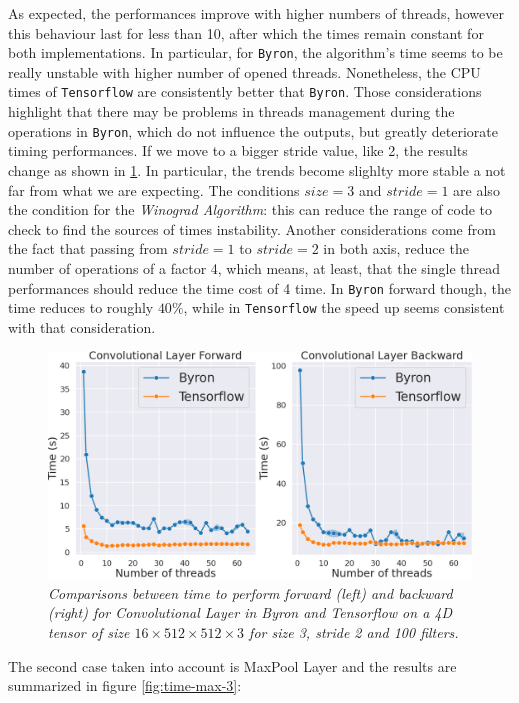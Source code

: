 \documentclass[12pt,a4paper]{report}
\begin{document}
As expected, the performances improve with higher numbers of threads, however this behaviour last for less than 10, after which the times remain constant for both implementations.
In particular, for {\tt Byron}, the algorithm's time seems to be really unstable with higher number of opened threads. 
Nonetheless, the CPU times of {\tt Tensorflow} are consistently better that {\tt Byron}.
Those considerations highlight that there may be problems in threads management during the operations in {\tt Byron}, which do not influence the outputs, but greatly deteriorate timing performances.
If we move to a bigger stride value, like 2, the results change as shown in \ref{fig:time-conv-3-2}. 
In particular, the trends become slighlty more stable a not far from what we are expecting.
The conditions $size=3$ and $stride=1$ are also the condition for the {\it Winograd Algorithm}: this can reduce the range of code to check to find the sources of times instability.
Another considerations come from the fact that passing from $stride=1$ to $stride=2$ in both axis, reduce the number of operations of a factor 4, which means, at least, that the single thread performances should reduce the time cost of 4 time.
In {\tt Byron} forward though, the time reduces to roughly $40\%$, while in {\tt Tensorflow} the speed up seems consistent with that consideration.

\begin{figure}[H]
\centering
\includegraphics[scale=0.3]{./images/convolutional_timing_3_2.png}
\caption{\it Comparisons between time to perform forward (left) and backward (right) for Convolutional Layer in Byron and Tensorflow on a 4D tensor of size $16 \times 512 \times 512 \times 3$ for size 3, stride 2 and 100 filters.}
\label{fig:time-conv-3-2}
\end{figure}

The second case taken into account is MaxPool Layer and the results are summarized in figure \ref{fig:time-max-3}:
\end{document}
